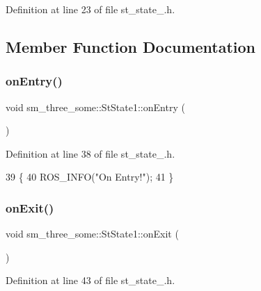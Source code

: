 Definition at line 23 of file st\+\_\+state\+\_.\+h.



\subsection{Member Function Documentation}
\mbox{\label{structsm__three__some_1_1StState1_addcf92fec018b57c6740acdd4ad0c05e}} 
\subsubsection{\texorpdfstring{on\+Entry()}{onEntry()}}
{\footnotesize\ttfamily void sm\+\_\+three\+\_\+some\+::\+St\+State1\+::on\+Entry (\begin{DoxyParamCaption}{ }\end{DoxyParamCaption})\hspace{0.3cm}{\ttfamily [inline]}}



Definition at line 38 of file st\+\_\+state\+\_.\+h.


\begin{DoxyCode}
39     \{
40         ROS\_INFO(\textcolor{stringliteral}{"On Entry!"});
41     \}
\end{DoxyCode}
\mbox{\label{structsm__three__some_1_1StState1_ae8b81c81aaf4ed4e061b8b5b88c8954b}} 
\subsubsection{\texorpdfstring{on\+Exit()}{onExit()}}
{\footnotesize\ttfamily void sm\+\_\+three\+\_\+some\+::\+St\+State1\+::on\+Exit (\begin{DoxyParamCaption}{ }\end{DoxyParamCaption})\hspace{0.3cm}{\ttfamily [inline]}}



Definition at line 43 of file st\+\_\+state\+\_.\+h.


